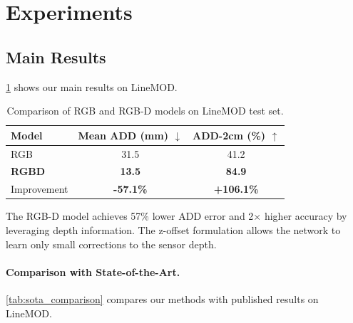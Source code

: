 \section{Experiments}
\label{sec:experiments}

\subsection{Main Results}

\cref{tab:main_results} shows our main results on LineMOD.

\begin{table}[h]
\centering
\caption{Comparison of RGB and RGB-D models on LineMOD test set.}
\label{tab:main_results}
\begin{tabular}{lcc}
\toprule
Model & Mean ADD (mm) $\downarrow$ & ADD-2cm (\%) $\uparrow$ \\
\midrule
RGB & 31.5 & 41.2 \\
\textbf{RGBD} & \textbf{13.5} & \textbf{84.9} \\
\midrule
Improvement & \textbf{-57.1\%} & \textbf{+106.1\%} \\
\bottomrule
\end{tabular}
\end{table}

The RGB-D model achieves 57\% lower ADD error and 2$\times$ higher accuracy by leveraging depth information. The z-offset formulation allows the network to learn only small corrections to the sensor depth.

\paragraph{Comparison with State-of-the-Art.}

\cref{tab:sota_comparison} compares our methods with published results on LineMOD.

